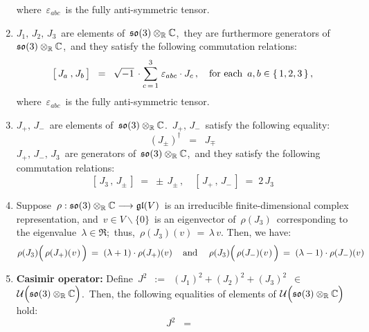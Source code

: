 \begin{proposition}
\begin{enumerate}
	where \,$\varepsilon_{abc}$\, is the fully anti-symmetric tensor.
\item
	$J_{1},\, J_{2},\, J_{3}$\, are elements of \,$\mathfrak{so}(3) \otimes_{\mathbb{R}} \mathbb{C}$,\,
	they are furthermore generators of \,$\mathfrak{so}(3) \otimes_{\mathbb{R}} \mathbb{C}$,\, and
	they satisfy the following commutation relations:
	\begin{equation*}
	\left[\,J_{a}\,\overset{{\color{white}1}}{,}\,J_{b}\,\right]
	\;\; = \;\;
		\sqrt{-1}\,\cdot\overset{3}{\underset{c\,=\,1}{\sum}}\;\varepsilon_{abc}\cdot J_{c}\,,
	\quad
	\textnormal{for each \,$a, b \in \{\,1,2,3\,\}$}\,,
	\end{equation*}
	where \,$\varepsilon_{abc}$\, is the fully anti-symmetric tensor.
\item
	$J_{+},\, J_{-}$\, are elements of \,$\mathfrak{so}(3) \otimes_{\mathbb{R}} \mathbb{C}$.\,
	$J_{+},\, J_{-}$\, satisfy the following equality:
	\begin{equation*}
	(J_{\pm})^{\dagger} \;\; = \;\; J_{\mp}
	\end{equation*}
	$J_{+},\, J_{-},\, J_{3}$\, are generators of \,$\mathfrak{so}(3) \otimes_{\mathbb{R}} \mathbb{C}$,\, and
	they satisfy the following commutation relations:
	\begin{equation*}
	\left[\,J_{3}\,,\,J_{\pm}\,\right] \;=\; \pm\,J_{\pm}\,,
	\quad
	\left[\,J_{+}\,,\,J_{-}\,\right] \;=\; 2\,J_{3}
	\end{equation*}
\item
	Suppose
	\,$\rho : \mathfrak{so}(3) \otimes_{\mathbb{R}} \mathbb{C} \longrightarrow \mathfrak{gl}(V)$\,
	is an irreducible finite-dimensional complex representation, and
	\,$v \in V \backslash\{0\}$\, is an eigenvector of \,$\rho(J_{3})$\,
	corresponding to the eigenvalue \,$\lambda \in \Re$;\, thus, \,$\rho(J_{3})(v) \,=\, \lambda\,v$.
	Then, we have:
	\begin{equation*}
	\rho(J_{3})\!\left(\,\rho(J_{+})(\overset{{\color{white}-}}{v})\,\right) \, = \; (\lambda+1)\cdot\rho(J_{+})(v)\,
	\quad\textnormal{and}\quad\;
	\rho(J_{3})\!\left(\,\rho(J_{-})(\overset{{\color{white}-}}{v})\,\right) \, = \; (\lambda-1)\cdot\rho(J_{-})(v)
	\end{equation*}
\item
	\textbf{Casimir operator:}\;\;
	Define
	\,$J^{2}$
	\,$:=$\,
	$(J_{1})^{2} + (J_{2})^{2} + (J_{3})^{2}$
	\,$\in$\
	 $\mathcal{U}\!\left(\so(3) \overset{{\color{white}.}}{\otimes_{\Re}} \C\right)$.\,
	Then, the following equalities of elements of
	\;$\mathcal{U}\!\left(\so(3) \overset{{\color{white}.}}{\otimes_{\Re}} \C\right)$
	hold:
	\begin{equation*}
	J^{2}
	\;\; =\;\;

\end{equation*}
\end{enumerate}
\end{proposition}
